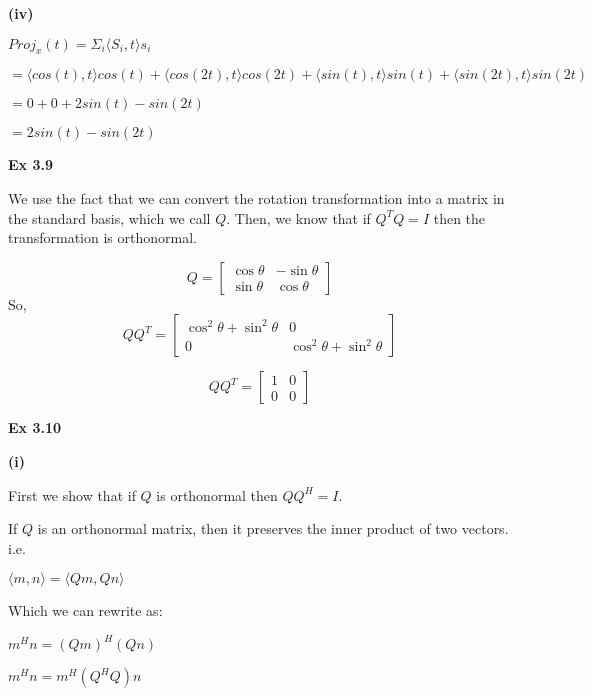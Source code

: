 \documentclass[letterpaper,12pt]{article}
\theoremstyle{definition}
\begin{document}
\begin{spacing}{1.3}{}
	\setlength{\leftskip}{10pt}
	
	\textbf{(iv)}
	
	\setlength{\leftskip}{20pt}
	
	$Proj_{x}(t) = \Sigma_{i}\langle S_i , t \rangle s_i$
	
	$= \langle cos(t), t \rangle cos(t) + \langle cos(2t), t \rangle cos(2t) + \langle sin(t), t \rangle sin(t) + \langle sin(2t), t \rangle sin(2t)$
	
	$= 0 + 0 + 2sin(t) - sin(2t)$
	
	$=2sin(t) - sin(2t)$
	
	\setlength{\leftskip}{0pt}
	
	\textbf{Ex 3.9}
	
	\setlength{\leftskip}{20pt}
	
	
	We use the fact that we can convert the rotation transformation into a matrix in the standard basis, which we call $Q$. Then, we know that if $Q^TQ = I$ then the transformation is orthonormal.
	
	\[Q=
	\begin{bmatrix}
	\cos \theta & -\sin \theta \\
	\sin \theta & \cos \theta
	\end{bmatrix}
	\]
	So,
	\[Q Q^{T}=
	\begin{bmatrix}
	\cos^{2} \theta + \sin^{2} \theta & 0 \\
	0 & \cos^{2} \theta + \sin^{2} \theta
	\end{bmatrix}
	\]
	
	\[Q Q^{T}=
	\begin{bmatrix}
	1 & 0 \\
	0 & 0
	\end{bmatrix}
	\]
	
	
	\setlength{\leftskip}{0pt}
	
	\textbf{Ex 3.10}
	
	\setlength{\leftskip}{10pt}
	
	\textbf{(i)}
	
	\setlength{\leftskip}{20pt}
	
	First we show that if $Q$ is orthonormal then $QQ^H = I$.
	
	If $Q$ is an orthonormal matrix, then it preserves the inner product of two vectors. i.e.
	
	$\langle m, n \rangle = \langle Qm, Qn \rangle$
	
	Which we can rewrite as:
	
	$m^Hn = (Qm)^H(Qn)$
	
	$m^Hn = m^H(Q^HQ)n$
	

\end{spacing}
\end{document}
